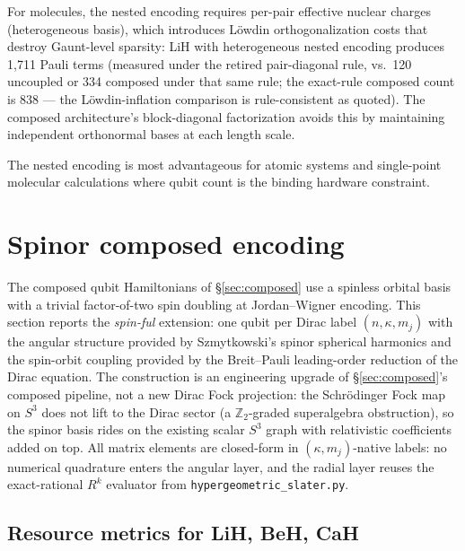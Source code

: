 \documentclass[aps,pra,twocolumn,superscriptaddress,longbibliography]{revtex4-2}
\begin{document}
For molecules, the nested encoding requires per-pair effective nuclear
charges (heterogeneous basis), which introduces L\"owdin
orthogonalization costs that destroy Gaunt-level sparsity: LiH with
heterogeneous nested encoding produces 1{,}711 Pauli terms (measured
under the retired pair-diagonal rule, vs.\ 120 uncoupled or 334 composed
under that same rule; the exact-rule composed count is 838 --- the
L\"owdin-inflation comparison is rule-consistent as quoted).  The composed architecture's block-diagonal
factorization avoids this by maintaining independent orthonormal bases at
each length scale.

The nested encoding is most advantageous for atomic systems and
single-point molecular calculations where qubit count is the binding
hardware constraint.



\section{Spinor composed encoding}
\label{sec:spinor_composed}

The composed qubit Hamiltonians of \S\ref{sec:composed} use a spinless
orbital basis with a trivial factor-of-two spin doubling at
Jordan--Wigner encoding. This section reports the
\emph{spin-ful} extension: one qubit per Dirac label $(n, \kappa, m_j)$
with the angular structure provided by Szmytkowski's spinor spherical
harmonics and the spin-orbit coupling provided by the Breit--Pauli
leading-order reduction of the Dirac equation.
The construction is an engineering upgrade of
\S\ref{sec:composed}'s composed pipeline, not a new Dirac Fock
projection: the Schr\"odinger Fock map on $S^3$ does not lift to the
Dirac sector (a $\mathbb{Z}_2$-graded superalgebra
obstruction), so the spinor basis rides on the existing
scalar $S^3$ graph with relativistic coefficients added on top. All
matrix elements are closed-form in $(\kappa, m_j)$-native labels: no
numerical quadrature enters the angular layer, and the radial layer
reuses the exact-rational $R^k$ evaluator from
\texttt{hypergeometric\_slater.py}.

\subsection{Resource metrics for LiH, BeH, CaH}
\label{subsec:spinor_resource}
\end{document}
